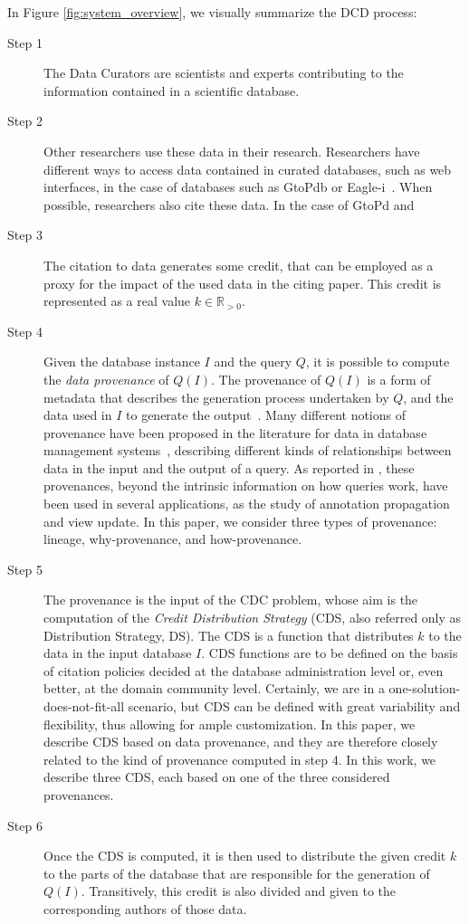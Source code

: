 In Figure \ref{fig:system_overview}, we visually summarize the DCD process:
\begin{description}
	\item[Step 1] The Data Curators are scientists and experts contributing to the information contained in a scientific database. 
	\item[Step 2] Other researchers use these data in their research. Researchers have different ways to access data contained in curated databases, such as web interfaces, in the case of databases such as GtoPdb \citep{iuphar2018} or Eagle-i~\citep{eagleI2017}. When possible, researchers also cite these data. In the case of GtoPd and 
	\item[Step 3] The citation to data generates some credit, that can be employed as a proxy for the impact of the used data in the citing paper. This credit is represented as a real value $k \in \mathbb{R}_{>0}$. %
	\item[Step 4] Given the database instance $I$ and the query $Q$, it is possible to compute the \emph{data provenance} of $Q(I)$. The provenance of $Q(I)$ is a form of metadata that describes the generation process undertaken by $Q$, and the data used in $I$ to generate the output~\citep{CheneyProvSurvey}. Many different notions of provenance have been proposed in the literature for data in database management systems~\citep{lineageCui, WhyProvBuneman, howProvenanceGreen, dosso2020prov}, describing different kinds of relationships between data in the input and the output of a query. As reported in \citep{CheneyProvSurvey}, these provenances, beyond the intrinsic information on how queries work, have been used in several applications, as the study of annotation propagation and view update. In this paper, we consider three types of provenance: lineage, why-provenance, and how-provenance.
	\item[Step 5] The provenance is the input of the CDC problem, whose aim is the computation of the \emph{Credit Distribution Strategy} (CDS, also referred only as Distribution Strategy, DS). The CDS is a function that distributes $k$ to the data in the input database $I$. 
	CDS functions are to be defined on the basis of citation policies decided at the database administration level or, even better, at the domain community level. 
	Certainly, we are in a one-solution-does-not-fit-all scenario, but CDS can be defined with great variability and flexibility, thus allowing for ample customization. 
	In this paper, we describe CDS based on data provenance, and they are therefore closely related to the kind of provenance computed in step 4. In this work, we describe three CDS, each based on one of the three considered provenances.
	\item[Step 6] Once the CDS is computed, it is then used to distribute the given credit $k$ to the parts of the database that are responsible for the generation of $Q(I)$. Transitively, this credit is also divided and given to the corresponding authors of those data.
\end{description}

